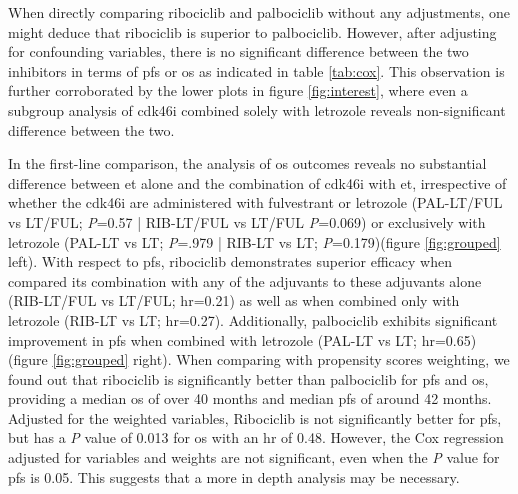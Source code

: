 When directly comparing ribociclib and palbociclib without any adjustments, one might deduce that ribociclib is superior to palbociclib. However, after adjusting for confounding variables, there is no significant difference between the two inhibitors in terms of \ac{pfs} or \ac{os} as indicated in table \ref{tab:cox}. This observation is further corroborated by the lower plots in figure \ref{fig:interest}, where even a subgroup analysis of \ac{cdk46i} combined solely with letrozole reveals non-significant difference between the two.

In the first-line comparison, the analysis of \ac{os} outcomes reveals no substantial difference between \ac{et} alone and the combination of \ac{cdk46i} with \ac{et}, irrespective of whether the \ac{cdk46i} are administered with fulvestrant or letrozole  (PAL-LT/FUL vs LT/FUL; \textit{P}=0.57 | RIB-LT/FUL vs LT/FUL \textit{P}=0.069) or exclusively with letrozole (PAL-LT vs LT; \textit{P}=.979 | RIB-LT vs LT; \textit{P}=0.179)(figure \ref{fig:grouped} left). With respect to \ac{pfs}, ribociclib demonstrates superior efficacy when compared its combination with any of the adjuvants to these adjuvants alone (RIB-LT/FUL vs LT/FUL; \ac{hr}=0.21) as well as when combined only with letrozole (RIB-LT vs LT; \ac{hr}=0.27). Additionally, palbociclib exhibits significant improvement in \ac{pfs} when combined with letrozole  (PAL-LT vs LT; \ac{hr}=0.65) (figure \ref{fig:grouped} right).
When comparing with propensity scores weighting, we found out that ribociclib is significantly better than palbociclib for \ac{pfs} and \ac{os}, providing a median \ac{os} of over 40 months and median \ac{pfs} of around 42 months. Adjusted for the weighted variables, Ribociclib is not significantly better for \ac{pfs}, but has a \textit{P} value of 0.013 for \ac{os} with an \ac{hr} of 0.48. However, the Cox regression adjusted for variables and weights are not significant, even when the \textit{P} value for \ac{pfs} is 0.05. This suggests that a more in depth analysis may be necessary.


